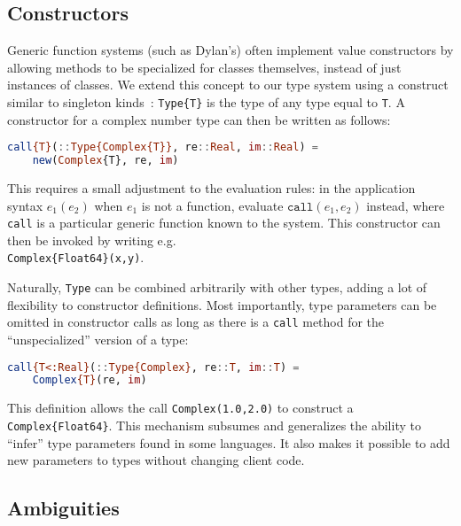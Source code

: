 \subsection{Constructors}
\label{sec:constructors}

Generic function systems (such as Dylan's) often implement value
constructors by allowing methods to be specialized for classes
themselves, instead of just instances of classes.
We extend this concept to our type system using a construct similar
to singleton kinds~\cite{Stone:2000:DTE:325694.325724}:
\texttt{Type\{T\}} is the type of any type equal to \texttt{T}.
A constructor for a complex number type can then be written as follows:

\begin{singlespace}
\begin{lstlisting}[language=julia]
call{T}(::Type{Complex{T}}, re::Real, im::Real) =
    new(Complex{T}, re, im)
\end{lstlisting}
\end{singlespace}

\noindent
This requires a small adjustment to the evaluation rules: in the application
syntax $e_1(e_2)$ when $e_1$ is not a function,
evaluate $\texttt{call}(e_1,e_2)$ instead, where \texttt{call} is
a particular generic function known to the system.
This constructor can then be invoked by writing e.g.\ \\
\texttt{Complex\{Float64\}(x,y)}.

Naturally, \texttt{Type} can be combined arbitrarily with other types,
adding a lot of flexibility to constructor definitions.
Most importantly, type parameters can be omitted in constructor calls
as long as there is a \texttt{call} method for the ``unspecialized'' version
of a type:

\begin{singlespace}
\begin{lstlisting}[language=julia]
call{T<:Real}(::Type{Complex}, re::T, im::T) =
    Complex{T}(re, im)
\end{lstlisting}
\end{singlespace}

This definition allows the call \texttt{Complex(1.0,2.0)} to
construct a \texttt{Complex\{Float64\}}.
This mechanism subsumes and generalizes the ability to ``infer''
type parameters found in some languages.
It also makes it possible to add new parameters to types without
changing client code.

\subsection{Ambiguities}

